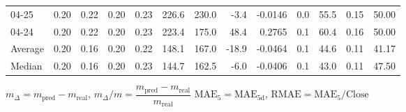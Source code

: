 \begin{threeparttable}
{\begin{tabular}{lrrrrrrrrrrrr}
  04-25 &          0.20 &          0.22 &          0.20 &        0.23 &               226.6 &               230.0 &       -3.4 &      -0.0146 &                 0.0 &             55.5 &            0.15 &                  50.00 \\
  04-24 &          0.20 &          0.22 &          0.20 &        0.23 &               223.4 &               175.0 &       48.4 &       0.2765 &                 0.1 &             60.4 &            0.16 &                  50.00 \\
Average &          0.20 &          0.16 &          0.20 &        0.22 &               148.1 &               167.0 &      -18.9 &      -0.0464 &                 0.1 &             44.6 &            0.11 &                  41.17 \\
 Median &          0.20 &          0.16 &          0.20 &        0.23 &               144.7 &               162.5 &       -6.0 &      -0.0406 &                 0.1 &             43.0 &            0.11 &                  47.50 \\
\bottomrule
\end{tabular}
}
\begin{tablenotes}\footnotesize
\item $m_\Delta=m_{\text{pred}}-m_{\text{real}}$,
$m_\Delta/m=\dfrac{m_{\text{pred}}-m_{\text{real}}}{m_{\text{real}}}$
$\mathrm{MAE}_5=\mathrm{MAE}_{5\text{d}}$,
$\mathrm{RMAE}=\mathrm{MAE}_5/\text{Close}$
\end{tablenotes}
\end{threeparttable}
\endgroup

